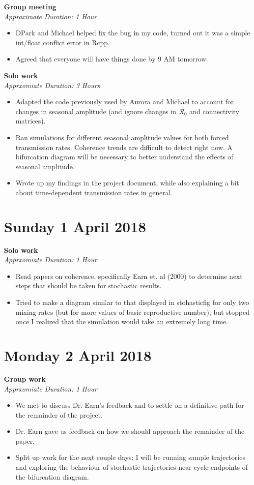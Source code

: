 \documentclass[12pt]{article}\usepackage[]{graphicx}\usepackage[]{color}
\begin{document}
\textbf{Group meeting} \\
\emph{Approximate Duration: 1 Hour}
\begin{itemize}
\item DPark and Michael helped fix the bug in my code, turned out it was a simple int/float conflict error in Rcpp.
\item Agreed that everyone will have things done by 9 AM tomorrow.
\end{itemize}

\textbf{Solo work} \\
\emph{Apprxomiate Duration: 3 Hours}
\begin{itemize}
\item Adapted the code previously used by Aurora and Michael to account for changes in seasonal amplitude (and ignore changes in $\mathcal{R}_0$ and connectivity matrices).
\item Ran simulations for different seasonal amplitude values for both forced transmission rates. Coherence trends are difficult to detect right now. A bifurcation diagram will be necessary to better understand the effects of seasonal amplitude.
\item Wrote up my findings in the project document, while also explaining a bit about time-dependent transmission rates in general.
\end{itemize}

\section*{Sunday 1 April 2018}

\textbf{Solo work} \\
\emph{Apprxomiate Duration: 1 Hour}
\begin{itemize}
\item Read papers on coherence, specifically Earn et. al (2000) to determine next steps that should be taken for stochastic results.
\item Tried to make a diagram similar to that displayed in stohasticfig for only two mixing rates (but for more values of basic reproductive number), but stopped once I realized that the simulation would take an extremely long time.
\end{itemize}

\section*{Monday 2 April 2018}

\textbf{Group work} \\
\emph{Apprxomiate Duration: 1 Hour}
\begin{itemize}
\item We met to discuss Dr. Earn's feedback and to settle on a definitive path for the remainder of the project.
\item Dr. Earn gave us feedback on how we should approach the remainder of the paper.
\item Split up work for the next couple days; I will be running sample trajectories and exploring the behaviour of stochastic trajectories near cycle endpoints of the bifurcation diagram. 
\end{itemize}
\end{document}
